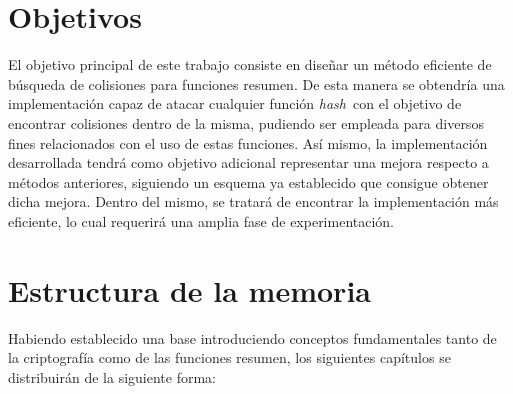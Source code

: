 \documentclass[12pt,spanish,listoffigures,listoftables,listofalgorithms]{tfgetsinf}
\newcommand{\hash}{\textit{hash}}
\begin{document}
\section{Objetivos}

El objetivo principal de este trabajo consiste en diseñar un método eficiente de búsqueda de colisiones para funciones resumen. De esta manera se obtendría una implementación capaz de atacar cualquier función \hash~con el objetivo de encontrar colisiones dentro de la misma, pudiendo ser empleada para diversos fines relacionados con el uso de estas funciones. Así mismo, la implementación desarrollada tendrá como objetivo adicional representar una mejora respecto a métodos anteriores, siguiendo un esquema ya establecido que consigue obtener dicha mejora. Dentro del mismo, se tratará de encontrar la implementación más eficiente, lo cual requerirá una amplia fase de experimentación.


\section{Estructura de la memoria}

Habiendo establecido una base introduciendo conceptos fundamentales tanto de la criptografía como de las funciones resumen, los siguientes capítulos se distribuirán de la siguiente forma:
\end{document}
